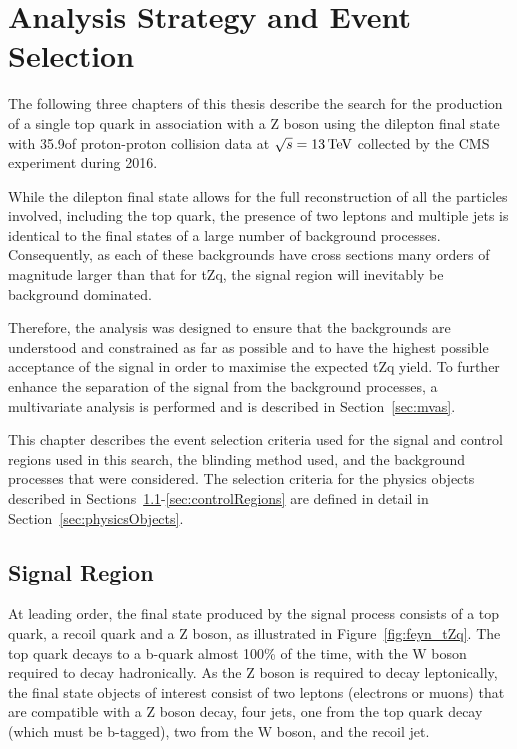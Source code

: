\chapter{Analysis Strategy and Event Selection}\label{chapter:tzq-search}
The following three chapters of this thesis describe the search for the production of a single top quark in association with a Z boson using the dilepton final state with 35.9\fbinv of proton-proton collision data at $\sqrt{s} = 13\,\text{Te\hspace{-.08em}V}$ collected by the CMS experiment during 2016.

While the dilepton final state allows for the full reconstruction of all the particles involved, including the top quark, the presence of two leptons and multiple jets is identical to the final states of a large number of background processes.
Consequently, as each of these backgrounds have cross sections many orders of magnitude larger than that for tZq, the signal region will inevitably be background dominated.

Therefore, the analysis was designed to ensure that the backgrounds are understood and constrained as far as possible and to have the highest possible acceptance of the signal in order to maximise the expected tZq yield.
To further enhance the separation of the signal from the background processes, a multivariate analysis is performed and is described in Section~\ref{sec:mvas}.

This chapter describes the event selection criteria used for the signal and control regions used in this search, the blinding method used, and the background processes that were considered.
The selection criteria for the physics objects described in Sections~\ref{sec:signalRegion}-\ref{sec:controlRegions} are defined in detail in Section~\ref{sec:physicsObjects}.

\section{Signal Region}\label{sec:signalRegion}
At leading order, the final state produced by the signal process consists of a top quark, a recoil quark and a Z boson, as illustrated in Figure~\ref{fig:feyn_tZq}.
The top quark decays to a b-quark almost 100\% of the time, with the W boson required to decay hadronically.
As the Z boson is required to decay leptonically, the final state objects of interest consist of two leptons (electrons or muons) that are compatible with a Z boson decay, four jets, one from the top quark decay (which must be b-tagged), two from the W boson, and the recoil jet.

